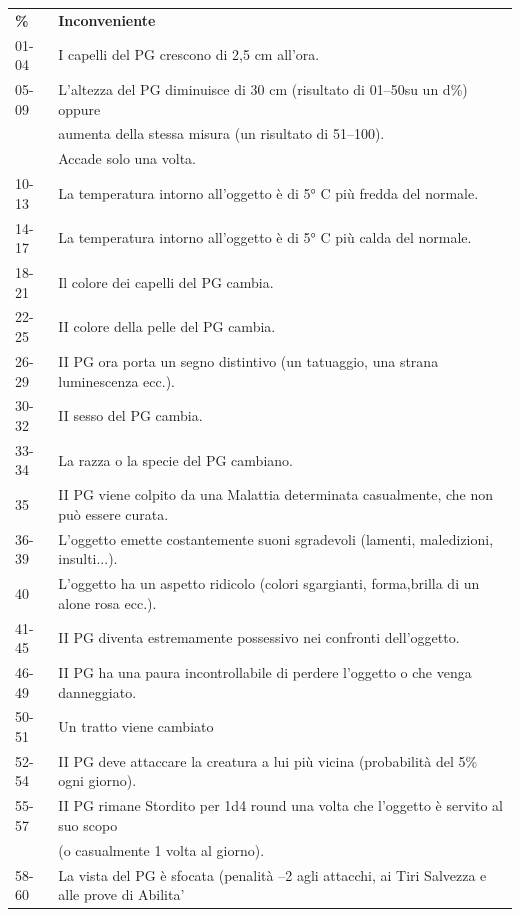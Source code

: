 \documentclass[a4paper,11pt,twoside,openany]{book}
\begin{document}
\begin{tabular}{ll}
	\toprule
	\textbf{\%} & \textbf{Inconveniente}\\
	01-04       & I capelli del PG crescono di 2,5 cm all'ora.\\
	05-09       & L'altezza del PG diminuisce di 30 cm (risultato di 01--50su un d\%) oppure  \\
	            & aumenta della stessa misura (un risultato di 51--100).   \\
	            & Accade solo una volta.\\
	10-13       & La temperatura intorno all'oggetto è di 5° C più fredda del normale.\\
	14-17       & La temperatura intorno all'oggetto è di 5° C più calda del normale.\\
	18-21       & Il colore dei capelli del PG cambia.\\
	22-25       & II colore della pelle del PG cambia.\\
	26-29       & II PG ora porta un segno distintivo (un tatuaggio, una strana
	luminescenza ecc.).\\
	30-32       & II sesso del PG cambia.\\
	33-34       & La razza o la specie del PG cambiano.\\
	35          & II PG viene colpito da una Malattia determinata casualmente,
	che non può essere curata.\\
	36-39       & L'oggetto emette costantemente suoni sgradevoli (lamenti, maledizioni, insulti...).\\
	40          & L'oggetto ha un aspetto ridicolo (colori sgargianti, forma,brilla di un alone rosa ecc.).\\
	41-45       & II PG diventa estremamente possessivo nei confronti dell'oggetto.\\
	46-49       & II PG ha una paura incontrollabile di perdere l'oggetto o che venga danneggiato.\\
	50-51       & Un tratto viene cambiato\\
	52-54       & II PG deve attaccare la creatura a lui più vicina (probabilità del 5\% ogni giorno).\\
	55-57       & II PG rimane Stordito per 1d4 round una volta che l'oggetto è servito al suo scopo       \\
	            & (o casualmente 1 volta al giorno).\\
	58-60       & La vista del PG è sfocata (penalità --2 agli attacchi, ai Tiri Salvezza e alle prove di Abilita'         \\

\end{tabular}
\end{document}
